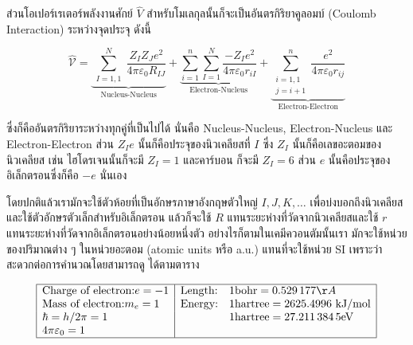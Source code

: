 ส่วนโอเปอร์เรเตอร์พลังงานศักย์ $\hat{V}$ สำหรับโมเลกุลนั้นก็จะเป็นอันตรกิริยาคูลอมบ์ (Coulomb Interaction) ระหว่างจุดประจุ ดังนี้

\begin{equation}
    \label{eq:potential_operator_molecule}
    \hat{\mathcal{V}}
    = \underbrace{
        \sum_{\substack{I=1,1}}^N \frac{Z_I Z_J e^2}{4 \pi \varepsilon_0 R_{I J}}
    }_
    {
        \text{Nucleus-Nucleus}
    }
    + \underbrace{
        \sum_{i=1}^n \sum_{I=1}^N \frac{-Z_I e^2}{4 \pi \varepsilon_0 r_{i I}}
    }_
    {
        \text{Electron-Nucleus}
    }
    + \underbrace{
        \sum_{\substack{i=1,1 \\ j=i+1}}^n \frac{e^2}{4 \pi \varepsilon_0 r_{i j}}
    }_
    {
        \text{Electron-Electron}
    }
\end{equation}

\noindent ซึ่งก็คืออันตรกิริยาระหว่างทุกคู่ที่เป็นไปได้ นั่นคือ Nucleus-Nucleus, Electron-Nucleus และ Electron-Electron
ส่วน $Z_I e$ นั้นก็คือประจุของนิวเคลียสที่ $I$ ซึ่ง $Z_I$ นั้นก็คือเลขอะตอมของนิวเคลียส เช่น ไฮโดรเจนนั้นก็จะมี $Z_I = 1$ และคาร์บอน%
ก็จะมี $Z_I=6$ ส่วน $e$ นั้นคือประจุของอิเล็กตรอนซึ่งก็คือ $-e$ นั่นเอง

โดยปกติแล้วเรามักจะใช้ตัวห้อยที่เป็นอักษรภาษาอังกฤษตัวใหญ่ $I, J, K, \ldots$ เพื่อบ่งบอกถึงนิวเคลียสและใช้ตัวอักษรตัวเล็กสำหรับอิเล็กตรอน
แล้วก็จะใช้ $R$ แทนระยะห่างที่วัดจากนิวเคลียสและใช้ $r$ แทนระยะห่างที่วัดจากอิเล็กตรอนอย่างน้อยหนึ่งตัว อย่างไรก็ตามในเคมีควอนตัมนั้นเรา%
มักจะใช้หน่วยของปริมาณต่าง ๆ ในหน่วยอะตอม (atomic units หรือ a.u.) แทนที่จะใช้หน่วย SI เพราะว่าสะดวกต่อการคำนวณโดยสามารถดู%
ได้ตามตาราง

\begin{equation*}
    \begin{array}{|l|ll|}
        \hline
        \text{Charge of electron:} e=-1 & \text{Length:} & 1 \text{bohr} = \num{0.529177} \AA                             \\
        \text{Mass of electron:} m_e=1  & \text{Energy:} & 1 \text{hartree} = \num{2625.4996} \mathrm{~kJ} / \mathrm{mol} \\
        \hbar=h / 2 \pi=1               &                & 1 \text{hartree} = \num{27.2113845} \mathrm{eV}                \\
        4 \pi \varepsilon_0=1           &                &                                                                \\
        \hline
    \end{array}
\end{equation*}

